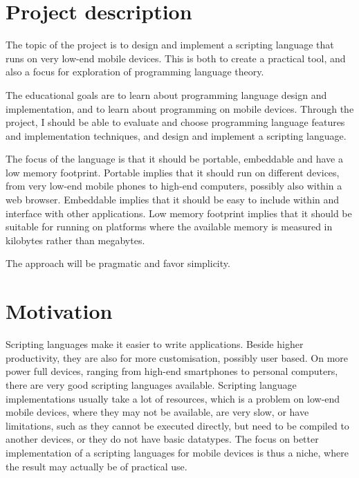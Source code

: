 \documentclass[11pt]{report}
\begin{document}
\section{Project description}
    The topic of the project is to design and implement a scripting language
that runs on very low-end mobile devices. This is both to create a practical tool, and
also a focus for exploration of programming language theory. 

\begin{comment}
The motivation is that a scripting language makes it is easier to make applications for mobile 
devices, and that existing freely available scripting languages
are very limited, slow, or simply does not run on the low-end mobile devices.
\end{comment}

    The educational goals are to learn about programming language design and
implementation, and to learn about programming on mobile devices. Through the
project, I should be able to evaluate and choose programming language features
and implementation techniques, and design and implement a scripting language.

    The focus of the language is that it should be portable, embeddable and have
a low memory footprint. Portable implies that it should run on different devices,
from very low-end mobile phones to high-end computers, possibly also within a web browser. 
Embeddable implies that it should be easy to include within and interface with
other applications. Low memory footprint implies that it should be suitable for
running on platforms where the available memory is measured in kilobytes rather
than megabytes. 

    The approach will be pragmatic and favor simplicity.

\section{Motivation}

Scripting languages make it easier to write applications\cite{scripting-ousterhout}. Beside higher productivity, they are also for more customisation, possibly user based.
On more power full devices, ranging from high-end smartphones to personal computers, there are very good scripting languages available.
Scripting language implementations usually take a lot of resources, which is a problem on low-end mobile devices, where they may not be available, are very slow, or have limitations, such as they cannot be executed directly, but need to be compiled to another devices, or they do not have basic datatypes.
The focus on better implementation of a scripting languages for mobile devices is thus a niche, where the result may actually be of practical use.
\end{document}
